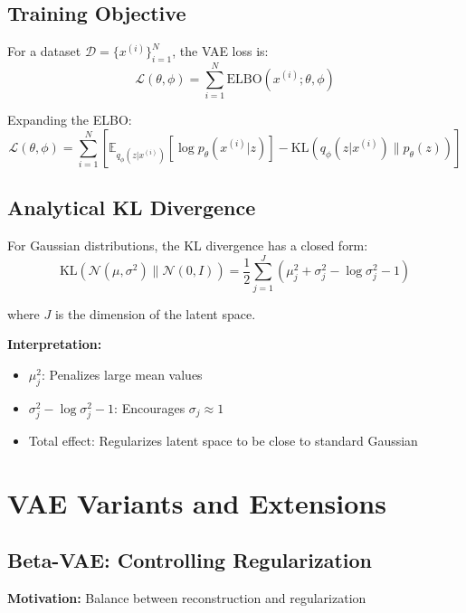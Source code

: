 \subsection{Training Objective}

For a dataset $\mathcal{D} = \{x^{(i)}\}_{i=1}^N$, the VAE loss is:
\begin{equation}
    \mathcal{L}(\theta, \phi) = \sum_{i=1}^N \text{ELBO}(x^{(i)}; \theta, \phi)
\end{equation}

Expanding the ELBO:
\begin{equation}
    \mathcal{L}(\theta, \phi) = \sum_{i=1}^N \left[ \mathbb{E}_{q_\phi(z|x^{(i)})}[\log p_\theta(x^{(i)}|z)] - \text{KL}(q_\phi(z|x^{(i)}) \| p_\theta(z)) \right]
\end{equation}

\subsection{Analytical KL Divergence}

For Gaussian distributions, the KL divergence has a closed form:
\begin{equation}
    \text{KL}(\mathcal{N}(\mu, \sigma^2) \| \mathcal{N}(0, I)) = \frac{1}{2} \sum_{j=1}^J (\mu_j^2 + \sigma_j^2 - \log \sigma_j^2 - 1)
\end{equation}

where $J$ is the dimension of the latent space.

\textbf{Interpretation:}
\begin{itemize}
    \item $\mu_j^2$: Penalizes large mean values
    \item $\sigma_j^2 - \log \sigma_j^2 - 1$: Encourages $\sigma_j \approx 1$
    \item Total effect: Regularizes latent space to be close to standard Gaussian
\end{itemize}

\section{VAE Variants and Extensions}

\subsection{Beta-VAE: Controlling Regularization}

\textbf{Motivation:} Balance between reconstruction and regularization

